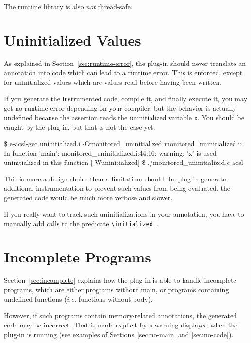 \begin{important}
The runtime library is also \emph{not} thread-safe.
\end{important}

\section{Uninitialized Values}

As explained in Section~\ref{sec:runtime-error}, the \eacsl plug-in should never
translate an annotation into \C code which can lead to a runtime error. This is
enforced, except for uninitialized values which are values read before having
been written.


If you generate the instrumented code, compile it, and finally execute it, you
may get no runtime error depending on your \C compiler, but the behavior is
actually undefined because the assertion reads the uninitialized variable
\lstinline|x|. You should be caught by the \eacsl plug-in, but that is not
the case yet.

\begin{logs}
\$ e-acsl-gcc uninitialized.i -Omonitored_uninitialized
monitored_uninitialized.i: In function 'main':
monitored_uninitialized.i:44:16: warning: 'x' is used uninitialized in this function
[-Wuninitialized]
\$ ./monitored_uninitialized.e-acsl
\end{logs}

This is more a design choice than a limitation: should the \eacsl plug-in
generate additional instrumentation to prevent such values from being evaluated,
the generated code would be much more verbose and slower.

If you really want to track such uninitializations in your annotation, you have
to manually add calls to the \eacsl predicate
\lstinline|\initialized|~\cite{eacsl}.

\section{Incomplete Programs}

Section~\ref{sec:incomplete} explains how the \eacsl plug-in is able to handle
incomplete programs, which are either programs without main, or programs
containing undefined functions (\emph{i.e.} functions without body).

However, if such programs contain memory-related annotations, the generated code
may be incorrect. That is made explicit by a warning displayed when the \eacsl
plug-in is running (see examples of Sections~\ref{sec:no-main} and
\ref{sec:no-code}).

